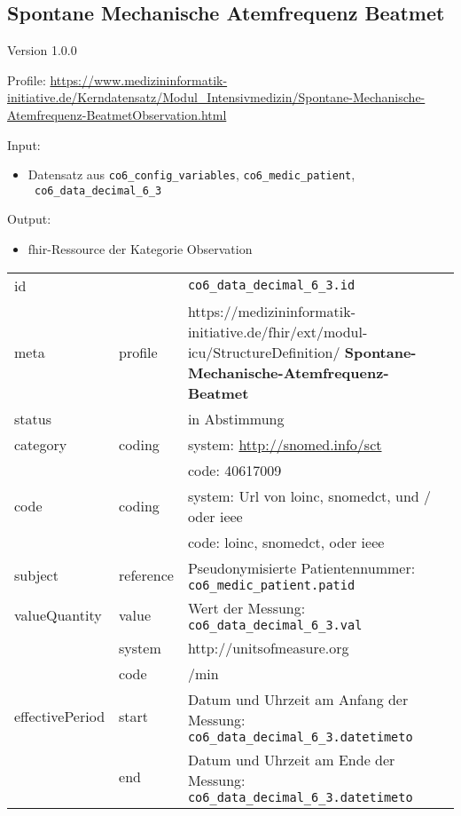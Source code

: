 \subsection{Spontane Mechanische Atemfrequenz Beatmet} 
\noindent Version 1.0.0

\noindent Profile: \url{https://www.medizininformatik-initiative.de/Kerndatensatz/Modul_Intensivmedizin/Spontane-Mechanische-Atemfrequenz-BeatmetObservation.html}

\noindent Input:
\begin{itemize}
	\item Datensatz aus \texttt{co6\_config\_variables}, \texttt{co6\_medic\_patient}, \\ \texttt{
co6\_data\_decimal\_6\_3}
\end{itemize}
Output:
\begin{itemize}
        \item \ac{fhir}-Ressource der Kategorie \glqq Observation\grqq{}
\end{itemize}
\begin{longtable}{|l|l|p{7.5cm}|}
        \hline
        \rowcolor{lightgray} \multicolumn{3}{|l|}{Data Mapping (inhaltlich)} \\ \hline
        id &  & \texttt{co6\_data\_decimal\_6\_3.id} \\ \hline
	meta & profile & https://medizininformatik-initiative.de/fhir/ext/modul-icu/StructureDefinition/\textbf{
Spontane-Mechanische-Atemfrequenz-Beatmet} \\ \hline 
	status &  & in Abstimmung  \\ \hline 
	category & coding & system: \url{http://snomed.info/sct} \\
\cline{3-3}
	& & code: 40617009 \\ \hline
	code & coding & system: Url von \ac{loinc}, \ac{snomedct}, und / oder \ac{ieee} \\ 
	\cline{3-3} 
	 &  & code: \ac{loinc}, \ac{snomedct}, oder \ac{ieee} \\ \hline
	subject & reference & Pseudonymisierte Patientennummer: \texttt{co6\_medic\_patient.patid} \\ \hline
	valueQuantity & value & Wert der Messung: \texttt{
co6\_data\_decimal\_6\_3.val} \\
        \cline{2-3}
         & system & http://unitsofmeasure.org \\
         \cline{2-3}
         & code & /min \\ \hline
    effectivePeriod & start & Datum und Uhrzeit am Anfang der Messung: \texttt{
co6\_data\_decimal\_6\_3.datetimeto} \\
    \cline{2-3}
     & end & Datum und Uhrzeit am Ende der Messung: \texttt{
co6\_data\_decimal\_6\_3.datetimeto} \\ \hline
\end{longtable}


